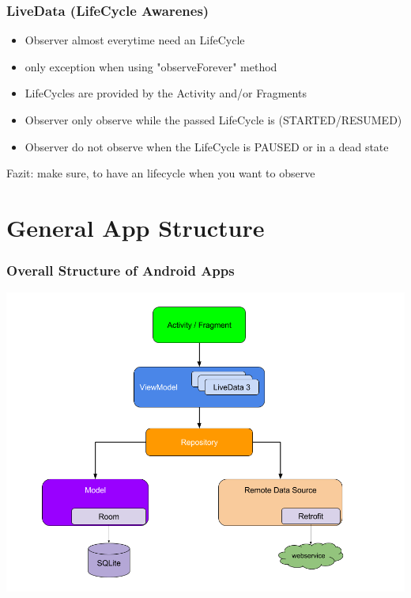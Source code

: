 \documentclass{beamer}
\begin{document}
	\begin{frame}
	\frametitle{LiveData (LifeCycle Awarenes)}
	\begin{itemize}
	\item Observer almost everytime need an LifeCycle
	\item only exception when using "observeForever" method
	\item LifeCycles are provided by the Activity and/or Fragments 
	\item Observer only observe while the passed LifeCycle is (STARTED/RESUMED)
	\item Observer do not observe when the LifeCycle is PAUSED or in a dead state
	\end{itemize}
	Fazit: make sure, to have an lifecycle when you want to observe
	\end{frame}	
	
	\section[App Structure]{General App Structure}
	\begin{frame}
		\frametitle{Overall Structure of Android Apps}
		\includegraphics[width=1\textwidth]{architecture.png}
	\end{frame}
	
\end{document}
